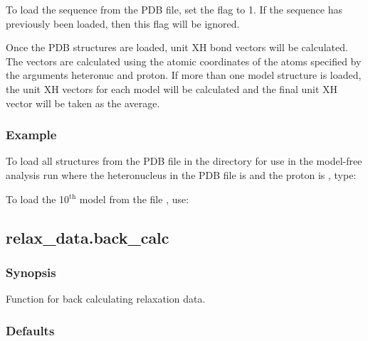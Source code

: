 To load the sequence from the PDB file, set the  flag to 1.  If the sequence has previously been loaded, then this flag will be ignored.


Once the PDB structures are loaded, unit XH bond vectors will be calculated.  The vectors are calculated using the atomic coordinates of the atoms specified by the arguments heteronuc and proton.  If more than one model structure is loaded, the unit XH vectors for each model will be calculated and the final unit XH vector will be taken as the average.



\subsubsection{Example}

To load all structures from the PDB file  in the directory  for use in the model-free analysis run  where the heteronucleus in the PDB file is  and the proton is , type:




To load the 10$^\mathrm{th}$ model from the file , use:






\newpage

\subsection{relax\_data.back\_calc}


\subsubsection{Synopsis}

Function for back calculating relaxation data.



\subsubsection{Defaults}

